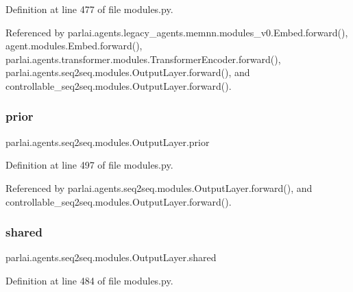 Definition at line 477 of file modules.\+py.



Referenced by parlai.\+agents.\+legacy\+\_\+agents.\+memnn.\+modules\+\_\+v0.\+Embed.\+forward(), agent.\+modules.\+Embed.\+forward(), parlai.\+agents.\+transformer.\+modules.\+Transformer\+Encoder.\+forward(), parlai.\+agents.\+seq2seq.\+modules.\+Output\+Layer.\+forward(), and controllable\+\_\+seq2seq.\+modules.\+Output\+Layer.\+forward().

\mbox{\label{classparlai_1_1agents_1_1seq2seq_1_1modules_1_1OutputLayer_aa727b98d848c1dcdee4149255d2d30ed}} 
\subsubsection{\texorpdfstring{prior}{prior}}
{\footnotesize\ttfamily parlai.\+agents.\+seq2seq.\+modules.\+Output\+Layer.\+prior}



Definition at line 497 of file modules.\+py.



Referenced by parlai.\+agents.\+seq2seq.\+modules.\+Output\+Layer.\+forward(), and controllable\+\_\+seq2seq.\+modules.\+Output\+Layer.\+forward().

\mbox{\label{classparlai_1_1agents_1_1seq2seq_1_1modules_1_1OutputLayer_a83aa3c50706ed16f09ee44423dbb73ad}} 
\subsubsection{\texorpdfstring{shared}{shared}}
{\footnotesize\ttfamily parlai.\+agents.\+seq2seq.\+modules.\+Output\+Layer.\+shared}



Definition at line 484 of file modules.\+py.



